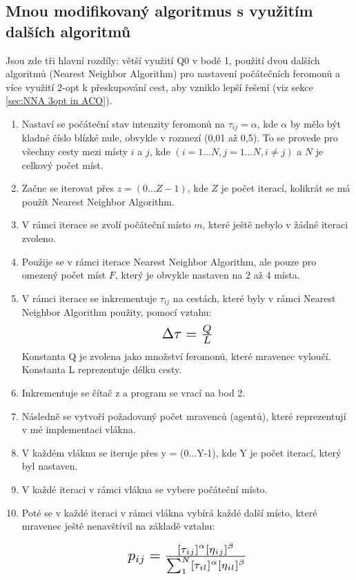 \subsection{Mnou modifikovaný algoritmus s využitím dalších algoritmů}
Jsou zde tři hlavní rozdíly: větší využití Q0 v bodě 1, použití dvou dalších algoritmů (Nearest Neighbor Algorithm) pro nastavení počátečních feromonů a více využití 2-opt k přeskupování cest, aby vzniklo lepší řešení (viz sekce \ref{sec:NNA 3opt in ACO}).

\begin{enumerate}
\item Nastaví se počáteční stav intenzity feromonů na $\tau_{ij} = \alpha$, kde $\alpha$ by mělo být kladné číslo blízké nule, obvykle v rozmezí (0,01 až 0,5). To se provede pro všechny cesty mezi místy $i$ a $j$, kde $(i = 1...N, j = 1...N, i \neq j)$ a $N$ je celkový počet míst.
\item Začne se iterovat přes $z = (0...Z-1)$, kde $Z$ je počet iterací, kolikrát se má použít Nearest Neighbor Algorithm.
\item V rámci iterace se zvolí počáteční místo $m$, které ještě nebylo v žádné iteraci zvoleno.
\item Použije se v rámci iterace Nearest Neighbor Algorithm, ale pouze pro omezený počet míst $F$, který je obvykle nastaven na 2 až 4 místa.
\item V rámci iterace se inkrementuje $\tau_{ij}$ na cestách, které byly v rámci Nearest Neighbor Algorithm použity, pomocí vztahu:
\begin{equation*}
\scalebox{1.5}{$\Delta \tau = \frac{Q}{L}$}
\end{equation*}
Konstanta Q je zvolena jako množství feromonů, které mravenec vyloučí. Konstanta L reprezentuje délku cesty.
\item Inkrementuje se čítač z a program se vrací na bod 2.
\item Následně se vytvoří požadovaný počet mravenců (agentů), které reprezentují v mé implementaci vlákna.
\item V každém vláknu se iteruje přes y = (0...Y-1), kde Y je počet iterací, který byl nastaven.
\item V každé iteraci v rámci vlákna se vybere počáteční místo.
\item Poté se v každé iteraci v rámci vlákna vybírá každé další místo, které mravenec ještě nenavštívil na základě vztahu:
\begin{center}
\begin{equation*}
\scalebox{1.5}{$p_{i j}=\frac{\left[\tau_{i j}\right]^\alpha\left[\eta_{i j}\right]^\beta}{\sum_{1}^{N}\left[\tau_{i l}\right]^\alpha\left[\eta_{i l}\right]^\beta}$}

\end{equation*}
\end{center}
\end{enumerate}
